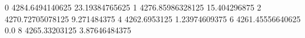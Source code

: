 0 4284.6494140625 23.19384765625
1 4276.85986328125 15.404296875
2 4270.72705078125 9.271484375
4 4262.6953125 1.23974609375
6 4261.45556640625 0.0
8 4265.33203125 3.87646484375
